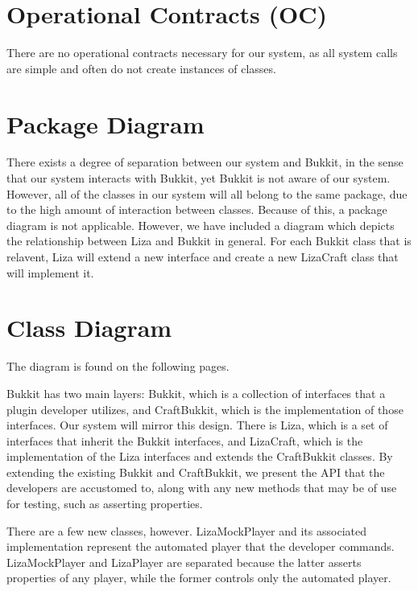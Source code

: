 \documentclass{article}
\begin{document}
\section{Operational Contracts (OC)}

There are no operational contracts necessary for our system, as all system
calls are simple and often do not create instances of classes.

\section{Package Diagram}

There exists a degree of separation between our system and Bukkit, in the
sense that our system interacts with Bukkit, yet Bukkit is not aware of our
system. However, all of the classes in our system will all belong to the same
package, due to the high amount of interaction between classes. Because
of this, a package diagram is not applicable.  However, we have included a 
diagram which depicts the relationship between Liza and Bukkit in general.
For each Bukkit class that is relavent, Liza will extend a new interface and 
create a new LizaCraft class that will implement it.



\section{Class Diagram}

The diagram is found on the following pages.
\newline

\noindent
Bukkit has two main layers: Bukkit, which is a collection of interfaces that
a plugin developer utilizes, and CraftBukkit, which is the implementation
of those interfaces. Our system will mirror this design. There is Liza, which
is a set of interfaces that inherit the Bukkit interfaces, and LizaCraft, which
is the implementation of the Liza interfaces and extends the CraftBukkit classes.
By extending the existing Bukkit and CraftBukkit, we present the API that
the developers are accustomed to, along with any new methods that may
be of use for testing, such as asserting properties. 
\newline

\noindent
There are a few new classes, however. LizaMockPlayer and its associated
implementation represent the automated player that the developer
commands. LizaMockPlayer and LizaPlayer are separated because the
latter asserts properties of any player, while the former controls only
the automated player.
\newline
\end{document}

